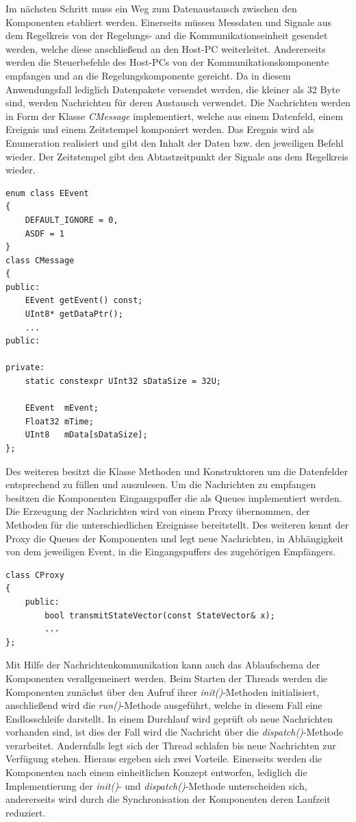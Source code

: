 Im nächsten Schritt muss ein Weg zum Datenaustausch zwischen den Komponenten etabliert werden. Einerseits müssen Messdaten und Signale aus dem Regelkreis von der Regelungs- and die Kommunikationseinheit gesendet werden, welche diese anschließend an den Host-PC weiterleitet. Andererseits werden die Steuerbefehle des Host-PCs von der Kommunikationskomponente empfangen und an die Regelungskomponente gereicht. Da in diesem Anwendungsfall lediglich Datenpakete versendet werden, die kleiner als 32 Byte sind, werden Nachrichten für deren Austausch verwendet. Die Nachrichten werden in Form der Klasse \textit{CMessage} implementiert, welche aus einem Datenfeld, einem Ereignis und einem Zeitstempel komponiert werden. Das Eregnis wird als Enumeration realisiert und gibt den Inhalt der Daten bzw. den jeweiligen Befehl wieder. Der Zeitstempel gibt den Abtastzeitpunkt der Signale aus dem Regelkreis wieder. 
\begin{lstlisting}
enum class EEvent
{
	DEFAULT_IGNORE = 0,
	ASDF = 1
}
class CMessage
{
public:
	EEvent getEvent() const;
	UInt8* getDataPtr();
	...
public:

private:
	static constexpr UInt32 sDataSize = 32U;

	EEvent  mEvent;
	Float32 mTime;	
	UInt8   mData[sDataSize];
};
\end{lstlisting}
Des weiteren besitzt die Klasse Methoden und Konstruktoren um die Datenfelder entsprechend zu füllen und auszulesen. Um die Nachrichten zu empfangen besitzen die Komponenten Eingangspuffer die als Queues implementiert werden. Die Erzeugung der Nachrichten wird von einem Proxy übernommen, der Methoden für die unterschiedlichen Ereignisse bereitstellt. Des weiteren kennt der Proxy die Queues der Komponenten und legt neue Nachrichten, in Abhängigkeit von dem jeweiligen Event, in die Eingangspuffers des zugehörigen Empfängers.
\begin{lstlisting}
class CProxy
{
	public:
		bool transmitStateVector(const StateVector& x);
		...
};
\end{lstlisting}
Mit Hilfe der Nachrichtenkommunikation kann auch das Ablaufschema der Komponenten verallgemeinert werden. Beim Starten der Threads werden die Komponenten zunächst über den Aufruf ihrer \textit{init()}-Methoden initialisiert, anschließend wird die \textit{run()}-Methode ausgeführt, welche in diesem Fall eine Endlosschleife darstellt. In einem Durchlauf wird geprüft ob neue Nachrichten vorhanden sind, ist dies der Fall wird die Nachricht über die \textit{dispatch()}-Methode verarbeitet. Andernfalls legt sich der Thread schlafen bis neue Nachrichten zur Verfügung stehen. Hieraus ergeben sich zwei Vorteile. Einerseits werden die Komponenten nach einem einheitlichen Konzept entworfen, lediglich die Implementierung der \textit{init()}- und \textit{dispatch()}-Methode unterscheiden sich, andererseits wird durch die Synchronisation der Komponenten deren Laufzeit reduziert.